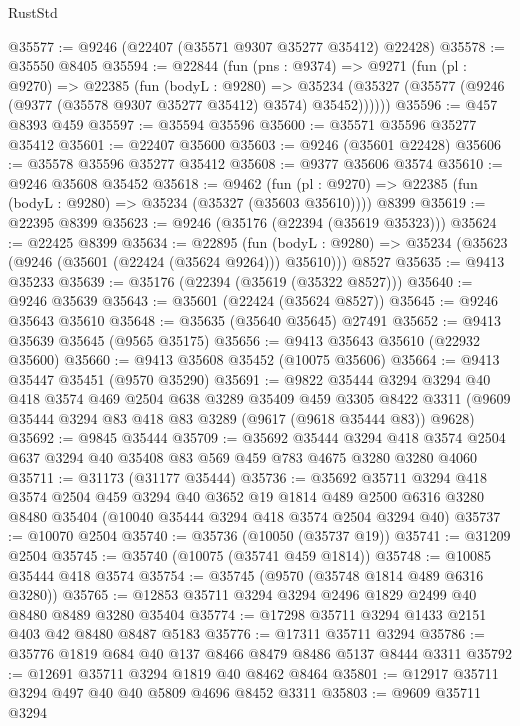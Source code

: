 \begin{lexlean}{RustStd}
\begin{coremodule}
@35577 := @9246 (@22407 (@35571 @9307 @35277 @35412) @22428)
@35578 := @35550 @8405
@35594 := @22844
    (fun (pns : @9374) =>
    @9271
      (fun (pl : @9270) =>
      @22385
        (fun (bodyL : @9280) =>
        @35234 (@35327 (@35577 (@9246 (@9377 (@35578 @9307 @35277 @35412) @3574) @35452))))))
@35596 := @457 @8393 @459
@35597 := @35594 @35596
@35600 := @35571 @35596 @35277 @35412
@35601 := @22407 @35600
@35603 := @9246 (@35601 @22428)
@35606 := @35578 @35596 @35277 @35412
@35608 := @9377 @35606 @3574
@35610 := @9246 @35608 @35452
@35618 := @9462
    (fun (pl : @9270) => @22385 (fun (bodyL : @9280) => @35234 (@35327 (@35603 @35610))))
    @8399
@35619 := @22395 @8399
@35623 := @9246 (@35176 (@22394 (@35619 @35323)))
@35624 := @22425 @8399
@35634 := @22895
    (fun (bodyL : @9280) => @35234 (@35623 (@9246 (@35601 (@22424 (@35624 @9264))) @35610)))
    @8527
@35635 := @9413 @35233
@35639 := @35176 (@22394 (@35619 (@35322 @8527)))
@35640 := @9246 @35639
@35643 := @35601 (@22424 (@35624 @8527))
@35645 := @9246 @35643 @35610
@35648 := @35635 (@35640 @35645) @27491
@35652 := @9413 @35639 @35645 (@9565 @35175)
@35656 := @9413 @35643 @35610 (@22932 @35600)
@35660 := @9413 @35608 @35452 (@10075 @35606)
@35664 := @9413 @35447 @35451 (@9570 @35290)
@35691 := @9822
    @35444
    @3294
    @3294
    @40
    @418
    @3574
    @469
    @2504
    @638
    @3289
    @35409
    @459
    @3305
    @8422
    @3311
    (@9609 @35444 @3294 @83 @418 @83 @3289 (@9617 (@9618 @35444 @83)) @9628)
@35692 := @9845 @35444
@35709 := @35692
    @35444
    @3294
    @418
    @3574
    @2504
    @637
    @3294
    @40
    @35408
    @83
    @569
    @459
    @783
    @4675
    @3280
    @3280
    @4060
@35711 := @31173 (@31177 @35444)
@35736 := @35692
    @35711
    @3294
    @418
    @3574
    @2504
    @459
    @3294
    @40
    @3652
    @19
    @1814
    @489
    @2500
    @6316
    @3280
    @8480
    @35404
    (@10040 @35444 @3294 @418 @3574 @2504 @3294 @40)
@35737 := @10070 @2504
@35740 := @35736 (@10050 (@35737 @19))
@35741 := @31209 @2504
@35745 := @35740 (@10075 (@35741 @459 @1814))
@35748 := @10085 @35444 @418 @3574
@35754 := @35745 (@9570 (@35748 @1814 @489 @6316 @3280))
@35765 := @12853 @35711 @3294 @3294 @2496 @1829 @2499 @40 @8480 @8489 @3280 @35404
@35774 := @17298 @35711 @3294 @1433 @2151 @403 @42 @8480 @8487 @5183
@35776 := @17311 @35711 @3294
@35786 := @35776 @1819 @684 @40 @137 @8466 @8479 @8486 @5137 @8444 @3311
@35792 := @12691 @35711 @3294 @1819 @40 @8462 @8464
@35801 := @12917 @35711 @3294 @497 @40 @40 @5809 @4696 @8452 @3311
@35803 := @9609 @35711 @3294

\end{coremodule}
\end{lexlean}
